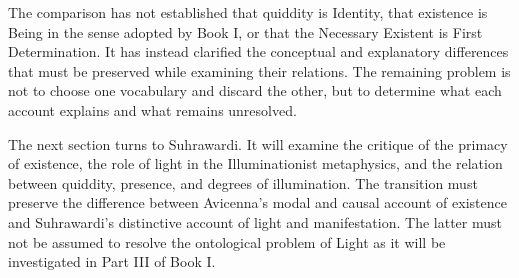 \label{para:VS.B01.P01.C08.S13.SS19.P002}

The comparison
has not
established that
quiddity is
Identity, that
existence is
Being in
the sense
adopted by
Book I,
or that
the Necessary
Existent is
First Determination.
It has
instead clarified
the conceptual
and explanatory
differences that
must be
preserved while
examining their
relations. The
remaining problem
is not
to choose
one vocabulary
and discard
the other,
but to
determine what
each account
explains and
what remains
unresolved.

\label{para:VS.B01.P01.C08.S13.SS19.P003}

The next
section turns
to Suhrawardi.
It will
examine the
critique of
the primacy
of existence,
the role
of light
in the
Illuminationist
metaphysics,
and the
relation between
quiddity,
presence,
and degrees
of illumination.
The transition
must preserve
the difference
between Avicenna's
modal and
causal account
of existence
and Suhrawardi's
distinctive account
of light and
manifestation. The
latter must
not be
assumed to
resolve the
ontological problem
of Light
as it
will be
investigated in
Part III
of Book I.


